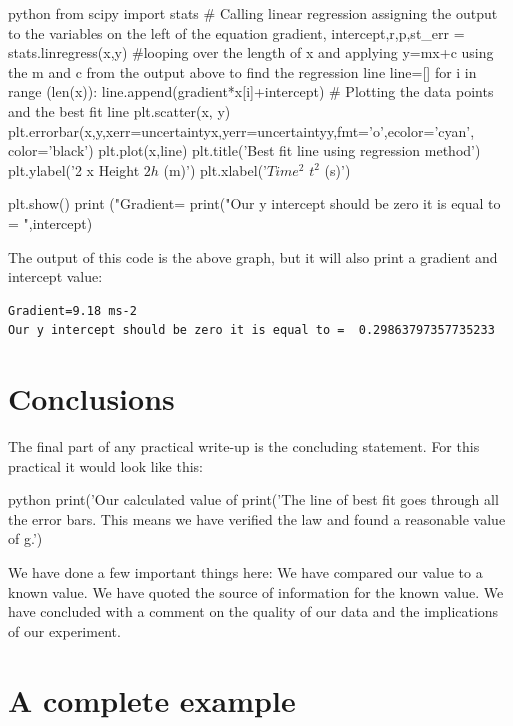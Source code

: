 \begin{fullwidth}
\begin{mintedbox}{python}
from scipy import stats
# Calling linear regression assigning the output to the variables on the left of the equation 
gradient, intercept,r,p,st_err = stats.linregress(x,y)
#looping over the length of x and applying y=mx+c using the m and c from the output above to find the regression line   
line=[]
for i in range (len(x)):
    line.append(gradient*x[i]+intercept)
# Plotting the data points and the best fit line
plt.scatter(x, y)
plt.errorbar(x,y,xerr=uncertaintyx,yerr=uncertaintyy,fmt='o',ecolor='cyan', color='black')
plt.plot(x,line)
plt.title('Best fit line using regression method')
plt.ylabel('2 x Height $2h$ (m)')
plt.xlabel('$Time^2$ $t^2$ (s)')

plt.show()
print ("Gradient=%
print("Our y intercept should be zero it is equal to = ",intercept)
\end{mintedbox}
\end{fullwidth}
The output of this code is the above graph, but it will also print a gradient and intercept value: 
\begin{verbatim}
Gradient=9.18 ms-2
Our y intercept should be zero it is equal to =  0.29863797357735233  
\end{verbatim}

\section{Conclusions}
The final part of any practical write-up is the concluding statement. For this practical it would look like this:

\begin{fullwidth}
    \begin{mintedbox}{python}
print('Our calculated value of %
print('The line of best fit goes through all the error bars. This means we have verified the law and found a reasonable value of g.')
    \end{mintedbox}
\end{fullwidth}
We have done a few important things here:
\titem We have compared our value to a known value.
\titem We have quoted the source of information for the known value.
\titem We have concluded with a comment on the quality of our data and the implications of our experiment.

\newpage
\section{A complete example}


